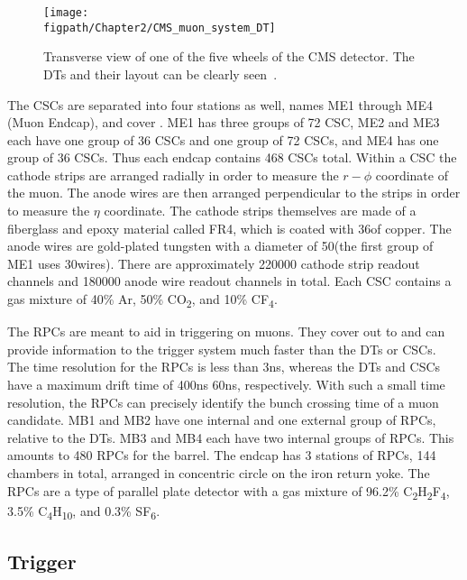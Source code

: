 \begin{figure}[!hbt]
	\centering
	\texttt{[image: \\figpath/Chapter2/CMS\_muon\_system\_DT]}
	\caption{Transverse view of one of the five wheels of the CMS detector. The DTs and their layout can be clearly seen~\cite{Chatrchyan:2008aa}.}
	\label{fig:CMS_muon_system_DT}
\end{figure}

The CSCs are separated into four stations as well, names ME1 through ME4 (Muon Endcap), and cover .
ME1 has three groups of 72 CSC, ME2 and ME3 each have one group of 36 CSCs and one group of 72 CSCs, and ME4 has one group of 36 CSCs.
Thus each endcap contains 468 CSCs total.
Within a CSC the cathode strips are arranged radially in order to measure the $r-\phi$ coordinate of the muon.
The anode wires are then arranged perpendicular to the strips in order to measure the $\eta$ coordinate.
The cathode strips themselves are made of a fiberglass and epoxy material called FR4, which is coated with 36\mum of copper.
The anode wires are gold-plated tungsten with a diameter of 50\mum (the first group of ME1 uses 30\mum wires).
There are approximately 220000 cathode strip readout channels and 180000 anode wire readout channels in total.
Each CSC contains a gas mixture of 40\% Ar, 50\% CO\textsubscript{2}, and 10\% CF\textsubscript{4}.

The RPCs are meant to aid in triggering on muons.
They cover out to  and can provide information to the trigger system much faster than the DTs or CSCs.
The time resolution for the RPCs is less than 3\unit{ns}, whereas the DTs and CSCs have a maximum drift time of 400\unit{ns} 60\unit{ns}, respectively.
With such a small time resolution, the RPCs can precisely identify the bunch crossing time of a muon candidate.
MB1 and MB2 have one internal and one external group of RPCs, relative to the DTs.
MB3 and MB4 each have two internal groups of RPCs.
This amounts to 480 RPCs for the barrel.
The endcap has 3 stations of RPCs, 144 chambers in total, arranged in concentric circle on the iron return yoke.
The RPCs are a type of parallel plate detector with a gas mixture of 96.2\% C\textsubscript{2}H\textsubscript{2}F\textsubscript{4}, 3.5\% C\textsubscript{4}H\textsubscript{10}, and 0.3\% SF\textsubscript{6}.

\subsection{Trigger}

